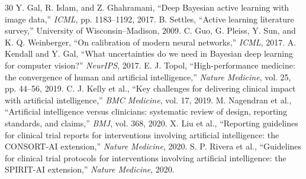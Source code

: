 \documentclass[journal]{IEEEtran}
\begin{document}
\begin{thebibliography}{30}
 Y. Gal, R. Islam, and Z. Ghahramani, ``Deep Bayesian active learning with image data,'' \emph{ICML}, pp. 1183--1192, 2017.
 B. Settles, ``Active learning literature survey,'' University of Wisconsin--Madison, 2009.
 C. Guo, G. Pleiss, Y. Sun, and K. Q. Weinberger, ``On calibration of modern neural networks,'' \emph{ICML}, 2017.
 A. Kendall and Y. Gal, ``What uncertainties do we need in Bayesian deep learning for computer vision?'' \emph{NeurIPS}, 2017.
 E. J. Topol, ``High-performance medicine: the convergence of human and artificial intelligence,'' \emph{Nature Medicine}, vol. 25, pp. 44--56, 2019.
 C. J. Kelly et al., ``Key challenges for delivering clinical impact with artificial intelligence,'' \emph{BMC Medicine}, vol. 17, 2019.
 M. Nagendran et al., ``Artificial intelligence versus clinicians: systematic review of design, reporting standards, and claims,'' \emph{BMJ}, vol. 368, 2020.
 X. Liu et al., ``Reporting guidelines for clinical trial reports for interventions involving artificial intelligence: the CONSORT-AI extension,'' \emph{Nature Medicine}, 2020.
 S. P. Rivera et al., ``Guidelines for clinical trial protocols for interventions involving artificial intelligence: the SPIRIT-AI extension,'' \emph{Nature Medicine}, 2020.
\end{thebibliography}
\end{document}
